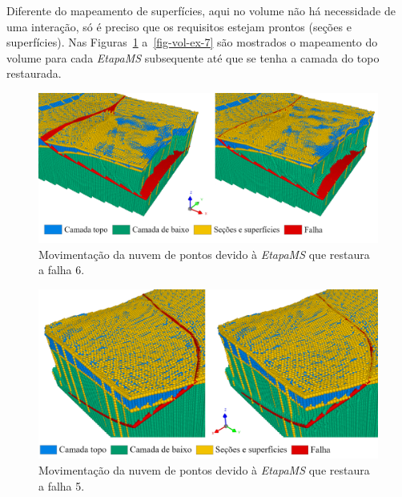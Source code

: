 Diferente do mapeamento de superfícies, aqui no volume não há necessidade de uma interação, só é preciso que os requisitos estejam prontos (seções e superfícies). Nas Figuras~\ref{fig-vol-ex-4} a~\ref{fig-vol-ex-7} são mostrados o mapeamento do volume para cada \emph{EtapaMS} subsequente até que se tenha a camada do topo restaurada.

\begin{figure} [H]
  \begin{center}
    \includegraphics[width=\textwidth]{images/fig-vol-ex-4}
    \caption{Movimentação da nuvem de pontos devido à \emph{EtapaMS} que restaura a falha 6.}\label{fig-vol-ex-4}
  \end{center}
\end{figure}

\begin{figure} [H]
  \begin{center}
    \includegraphics[width=\textwidth]{images/fig-vol-ex-5}
    \caption{Movimentação da nuvem de pontos devido à \emph{EtapaMS} que restaura a falha 5.}\label{fig-vol-ex-5}
  \end{center}
\end{figure}

